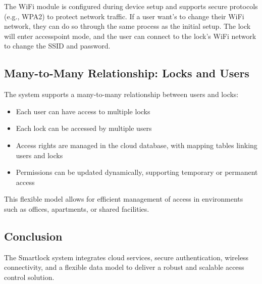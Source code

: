 The WiFi module is configured during device setup and supports secure protocols (e.g., WPA2) to protect network traffic. If a user want's to change their WiFi network, they can do so through the same process as the initial setup. The lock will enter accesspoint mode, and the user can connect to the lock's WiFi network to change the SSID and password.

\subsection{Many-to-Many Relationship: Locks and Users}
The system supports a many-to-many relationship between users and locks:
\begin{itemize}
    \item Each user can have access to multiple locks
    \item Each lock can be accessed by multiple users
    \item Access rights are managed in the cloud database, with mapping tables linking users and locks
    \item Permissions can be updated dynamically, supporting temporary or permanent access
\end{itemize}
This flexible model allows for efficient management of access in environments such as offices, apartments, or shared facilities.

\subsection{Conclusion}
The Smartlock system integrates cloud services, secure authentication, wireless connectivity, and a flexible data model to deliver a robust and scalable access control solution.

